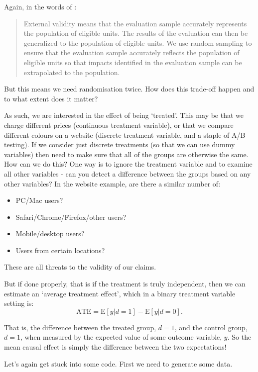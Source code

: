 \documentclass[
]{book}
\providecommand{\tightlist}{%
  \setlength{\itemsep}{0pt}\setlength{\parskip}{0pt}}
\begin{document}
Again, in the words of \citet[p.~73]{gertler2016impact}:

\begin{quote}
External validity means that the evaluation sample accurately represents the population of eligible units. The results of the evaluation can then be generalized to the population of eligible units. We use random sampling to ensure that the evaluation sample accurately reflects the population of eligible units so that impacts identified in the evaluation sample can be extrapolated to the population.
\end{quote}

But this means we need randomisation twice. How does this trade-off happen and to what extent does it matter?

As such, we are interested in the effect of being `treated'. This may be that we charge different prices (continuous treatment variable), or that we compare different colours on a website (discrete treatment variable, and a staple of A/B testing). If we consider just discrete treatments (so that we can use dummy variables) then need to make sure that all of the groups are otherwise the same. How can we do this? One way is to ignore the treatment variable and to examine all other variables - can you detect a difference between the groups based on any other variables? In the website example, are there a similar number of:

\begin{itemize}
\tightlist
\item
  PC/Mac users?
\item
  Safari/Chrome/Firefox/other users?
\item
  Mobile/desktop users?
\item
  Users from certain locations?
\end{itemize}

These are all threats to the validity of our claims.

But if done properly, that is if the treatment is truly independent, then we can estimate an `average treatment effect', which in a binary treatment variable setting is:
\[\mbox{ATE} = \mbox{E}[y|d=1] - \mbox{E}[y|d=0].\]

That is, the difference between the treated group, \(d = 1\), and the control group, \(d = 1\), when measured by the expected value of some outcome variable, \(y\). So the mean causal effect is simply the difference between the two expectations!

Let's again get stuck into some code. First we need to generate some data.
\end{document}
